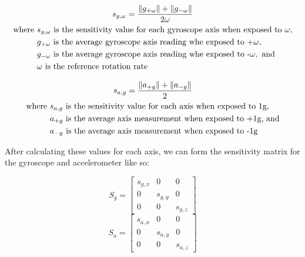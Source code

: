 \begin{gather} \labeq{gyroscope_sensitivity}
    s_{g, \omega} = \frac{\lVert g_{+\omega}\rVert + \lVert g_{-\omega}\rVert}{2\omega} \\
    \begin{aligned}
        \text{where } & s_{g,\omega} \text{ is the sensitivity value for each gyroscope axis when exposed to } \omega , \\
        & g_{+\omega } \text{ is the average gyroscope axis reading whe exposed to +} \omega ,\\
        & g_{-\omega } \text{ is the average gyroscope axis reading whe exposed to -} \omega , \text{ and} \\
        & \omega \text{ is the reference rotation rate}
    \end{aligned} \notag
\end{gather}

\begin{gather} \labeq{accelerometer_sensitivity}
    s_{a, g} = \frac{\lVert a_{+g} \rVert + \lVert a_{-g} \rVert}{2} \\
    \begin{aligned}
        \text{where } & s_{a,g} \text{ is the sensitivity value for each axis when exposed to 1g,} \\
        & a_{+g} \text{ is the average axis measurement when exposed to +1g, and} \\
        & a_{-g} \text{ is the average axis measurement when exposed to -1g}
    \end{aligned} \notag
\end{gather}

After calculating these values for each axis, we can form the sensitivity matrix for the gyroscope and accelerometer like so:

\begin{equation}
    S_g = 
    \begin{bmatrix}
        s_{g,x} & 0 & 0 \\
        0 & s_{g,y} & 0 \\
        0 & 0 & s_{g,z}
    \end{bmatrix} 
\end{equation}
\begin{equation}
    S_a =
    \begin{bmatrix}
        s_{a,x} & 0 & 0 \\
        0 & s_{a,y} & 0 \\
        0 & 0 & s_{a,z}
    \end{bmatrix}
\end{equation}

